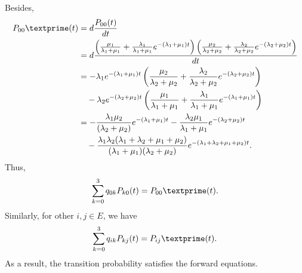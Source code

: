 \documentclass{amsart}
\theoremstyle{plain}
\theoremstyle{definition}
\begin{document}
Besides,
\begin{align*}
  P_{00}\textprime (t) &= d\frac{P_{00}(t)}{dt} \\
   		&= d\frac{ \left(\frac{\mu_1}{\lambda_1 + \mu_1} + \frac{\lambda_1}{\lambda_1 + \mu_1}e^{-(\lambda_1 + \mu_1)      t}\right)
 	   \left(\frac{\mu_2}{\lambda_2 + \mu_2} + \frac{\lambda_2}{\lambda_2+ \mu_2}e^{-(\lambda_2 + \mu_2)t}\right)}{dt} \\
 	   &=-\lambda_1e^{-(\lambda_1 + \mu_1)t} \left(\frac{\mu_2}{\lambda_2 + \mu_2} + \frac{\lambda_2}{\lambda_2+ \mu_2}e^{-(\lambda_2 + \mu_2)t}\right) \\
 	   & \ \ \ - \lambda_2 e^{-(\lambda_2 + \mu_2)t} \left(\frac{\mu_1}{\lambda_1 + \mu_1} + \frac{\lambda_1}{\lambda_1 + \mu_1}e^{-(\lambda_1 + \mu_1)t}\right) \\
 	   &=-\frac{\lambda_1\mu_2}{(\lambda_2+\mu_2)}e^{-(\lambda_1 + \mu_1)t} - \frac{\lambda_2\mu_1}{\lambda_1+\mu_1}e^{-(\lambda_2 + \mu_2)t} \\
 	   & \ \ \ - \frac{\lambda_1\lambda_2(\lambda_1+\lambda_2 +\mu_1+ \mu_2)}{(\lambda_1+\mu_1)(\lambda_2+\mu_2)}e^{-(\lambda_1+\lambda_2 +\mu_1+ \mu_2)t}.
\end{align*}
Thus,
\[\sum_{k=0}^{3}q_{0k}P_{k0}(t) = P_{00}\textprime (t).\]
Similarly, for other $i,j \in E$, we have 
\[\sum_{k=0}^{3}q_{ik}P_{kj}(t) = P_{ij}\textprime (t).\]
As a result, the transition probability satisfies the forward equations.\\
\end{document}

